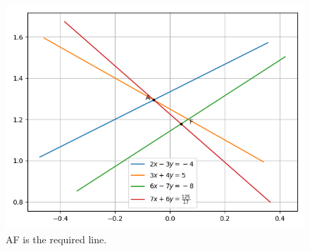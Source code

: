 \documentclass[journal,12pt,twocolumn]{IEEEtran}
\begin{document}
\begin{enumerate}
\begin{figure}[!ht]
        \centering
        \includegraphics[width=\columnwidth]{figs/crossing.png}
        \caption{AF is the required line.}
        \label{fig:crossing}
    \end{figure}
\end{enumerate}
\end{document}
